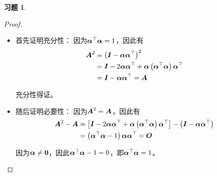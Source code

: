 \documentclass{ctexart}
\newtheorem{problem}{习题}[section]
\begin{document}
\setcounter{problem}{18}
\begin{problem}
\end{problem}
\begin{proof}
    \begin{itemize}
        \item 首先证明充分性：
              因为\(\vecal^\top\vecal=1\)，因此有
              \begin{align*}
                  \mata^2 & =\mypar{\mati-\vecal\vecal^\top}^2                                   \\
                          & =\mati-2\vecal\vecal^\top+\vecal\mypar{\vecal^\top\vecal}\vecal^\top \\
                          & =\mati-\vecal\vecal^\top=\mata
              \end{align*}

              充分性得证。

        \item 随后证明必要性：
              因为\(\mata^2=\mata\)，因此有
              \begin{align*}
                  \mata^2-\mata & =\mat{\mati-2\vecal\vecal^\top+\vecal\mypar{\vecal^\top\vecal}\vecal^\top}-\mypar{\mati-\vecal\vecal^\top} \\
                                & =\mypar{\vecal^\top\vecal-1}\vecal\vecal^\top=\mato
              \end{align*}

              因为\(\vecal\neq\veczero\)，因此\(\vecal^\top\vecal-1=0\)，即\(\vecal^\top\vecal=1\)。
    \end{itemize}
\end{proof}
\end{document}
